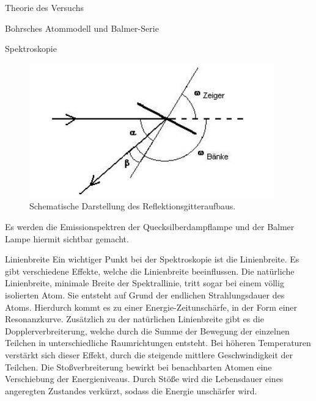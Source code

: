 \documentclass[pdftex, a4paper,11pt, twoside, ngerman]{report}
\begin{document}
\begin{chapter}{Theorie des Versuchs}
\begin{section}{Bohrsches Atommodell und Balmer-Serie}
\begin{subsection}{Spektroskopie}
        \begin{figure}[htbp]
          \begin{center}
            \includegraphics[width=.8\textwidth]{Figures/Gitteraufbau.png}
            \caption{Schematische Darstellung des Reflektionsgitteraufbaus.
                \cite{bib:LDDidactic}}
            \label{fig:Gitteraufbau}
          \end{center}
        \end{figure}
       
        Es werden die Emissionspektren der Quecksilberdampflampe und der Balmer
        Lampe hiermit sichtbar gemacht.
     
      \end{subsection}
     
     
     
      \begin{subsection}{Linienbreite}
        \label{chp:TheorieBohrBalmerSerieLinienbreite}
        Ein wichtiger Punkt bei der Spektroskopie ist die Linienbreite. Es gibt
        verschiedene Effekte, welche die Linienbreite beeinflussen. Die
        natürliche Linienbreite, minimale Breite der Spektrallinie, tritt
        sogar bei einem völlig isolierten Atom. Sie entsteht auf Grund der
        endlichen Strahlungsdauer des Atoms. Hierdurch kommt es zu einer
        Energie-Zeitunschärfe, in der Form einer Resonanzkurve. Zusätzlich zu
        der natürlichen Linienbreite gibt es die Dopplerverbreiterung, welche
        durch die Summe  der Bewegung der einzelnen Teilchen in
        unterschiedliche Raumrichtungen entsteht. Bei höheren Temperaturen
        verstärkt sich dieser Effekt, durch die steigende mittlere
        Geschwindigkeit der Teilchen. Die Stoßverbreiterung bewirkt bei
        benachbarten Atomen eine Verschiebung der Energieniveaus. Durch Stöße
        wird die Lebensdauer eines angeregten Zustandes verkürzt, sodass die
        Energie unschärfer wird.
       
       
      \end{subsection}
     
    \end{section}

  \end{chapter}
\end{document}
